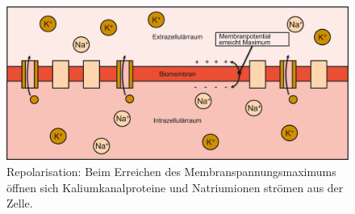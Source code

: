 \begin{figure}
    \centering
    \includegraphics[width=\textwidth]{papers/nerven/Bilder/Vorgang4.png}
    \caption{Repolarisation: Beim Erreichen des Membranspannungsmaximums öffnen sich Kaliumkanalproteine und Natriumionen strömen aus der Zelle.}
    \label{fig:Repolarisation}
\end{figure}
